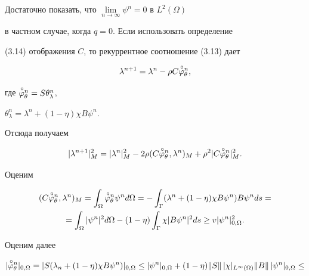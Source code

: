  


\begin{pf} 


Достаточно показать, что $\lim\limits_{n\to\infty}\psi^n=0$ в $L^2(\Omega)$ 


в частном случае, когда $q=0$. Если использовать определение 


(3.14) отображения $C$, то рекуррентное соотношение (3.13) дает 


$$ 


\lambda^{n+1}=\lambda^n-\rho C\up{\varphi}^n_\theta, 


$$ 


где $\overset{\,\circ}{\varphi}{}^n_\theta=S\theta^n_\lambda$, 


$\theta^n_\lambda=\lambda^n+(1-\eta)\chi B\psi^n$. 


Отсюда получаем 


\begin{equation} 


|\lambda^{n+1}|^2_M=|\lambda^n|^2_M-2\rho(C\up{\varphi}^n_\theta, 


\lambda^n)_M+\rho^2|C\up{\varphi}^n_\theta|^2_M. 


\end{equation} 


 


Оценим 


\begin{multline*} 


(C\up{\varphi}^n_\theta,\lambda^n)_M=\int_\Omega\up{\varphi}^n_\theta 


\psi^n d\Omega=-\int_\Gamma(\lambda^n+(1-\eta)\chi B\psi^n)B\psi^n ds=\\ 


% 


=\int_\Omega|\psi^n|^2d\Omega-(1-\eta)\int_\Gamma \chi 


|B\psi^n|^2ds\ge v|\psi^n|^2_{0,\Omega}. 


\end{multline*} 


Оценим далее 


\begin{multline*} 


|\up{\varphi}^n_\theta|_{0,\Omega}=|S(\lambda_n+(1-\eta)\chi 


B\psi^n)|_{0,\Omega}\le|\psi^n|_{0,\Omega}+(1-\eta) 


\|S\|\,|\chi|_{L^\infty(\Omega)}\|B\|\,|\psi^n|_{0,\Omega}\le\\ 



\end{multline*}
\end{pf}
